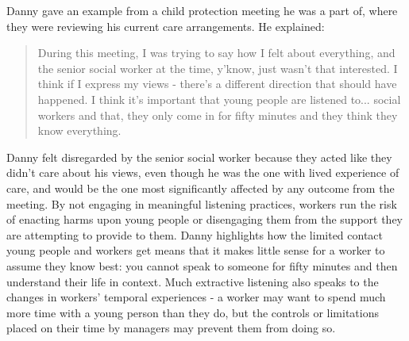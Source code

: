 Danny gave an example from a child protection meeting he was a part of, where they were reviewing his current care arrangements. He explained:
\begin{quote}
During this meeting, I was trying to say how I felt about everything, and the senior social worker at the time, y'know, just wasn't that interested. I think if I express my views - there's a different direction that should have happened. I think it's important that young people are listened to... social workers and that, they only come in for fifty minutes and they think they know everything.
\end{quote}
Danny felt disregarded by the senior social worker because they acted like they didn't care about his views, even though he was the one with lived experience of care, and would be the one most significantly affected by any outcome from the meeting. By not engaging in meaningful listening practices, workers run the risk of enacting harms upon young people or disengaging them from the support they are attempting to provide to them. Danny highlights how the limited contact young people and workers get means that it makes little sense for a worker to assume they know best: you cannot speak to someone for fifty minutes and then understand their life in context. Much extractive listening also speaks to the changes in workers' temporal experiences - a worker may want to spend much more time with a young person than they do, but the  controls or limitations placed on their time by managers may prevent them from doing so.

